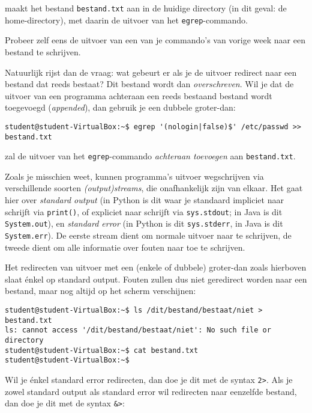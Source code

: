 \documentclass[a4paper,twoside,openany]{memoir}
\begin{document}
maakt het bestand \verb!bestand.txt! aan in de huidige directory (in dit geval:
de home-directory), met daarin de uitvoer van het \verb!egrep!-commando.

Probeer zelf eens de uitvoer van een van je commando's van vorige week naar een
bestand te schrijven.

Natuurlijk rijst dan de vraag: wat gebeurt er als je de uitvoer redirect naar
een bestand dat reeds bestaat? Dit bestand wordt dan \emph{overschreven}. Wil je
dat de uitvoer van een programma achteraan een reeds bestaand bestand wordt
toegevoegd (\emph{appended}), dan gebruik je een dubbele groter-dan:

\begin{verbatim}
student@student-VirtualBox:~$ egrep '(nologin|false)$' /etc/passwd >> bestand.txt
\end{verbatim}

zal de uitvoer van het \verb!egrep!-commando \emph{achteraan toevoegen} aan
\verb!bestand.txt!.

Zoals je misschien weet, kunnen programma's uitvoer wegschrijven via
verschillende soorten \emph{(output)streams}, die onafhankelijk zijn van elkaar.
Het gaat hier over \emph{standard output} (in Python is dit waar je standaard
impliciet naar schrijft via \verb!print()!, of expliciet naar schrijft via
\verb!sys.stdout!; in Java is dit \verb!System.out!), en \emph{standard error}
(in Python is dit \verb!sys.stderr!, in Java is dit \verb!System.err!). De
eerste stream dient om normale uitvoer naar te schrijven, de tweede dient om
alle informatie over fouten naar toe te schrijven.

Het redirecten van uitvoer met een (enkele of dubbele) groter-dan zoals
hierboven slaat énkel op standard output. Fouten zullen dus niet geredirect
worden naar een bestand, maar nog altijd op het scherm verschijnen:

\begin{verbatim}
student@student-VirtualBox:~$ ls /dit/bestand/bestaat/niet > bestand.txt
ls: cannot access '/dit/bestand/bestaat/niet': No such file or directory
student@student-VirtualBox:~$ cat bestand.txt
student@student-VirtualBox:~$
\end{verbatim}

Wil je énkel standard error redirecten, dan doe je dit met de syntax \verb!2>!.
Als je zowel standard output als standard error wil redirecten naar eenzelfde
bestand, dan doe je dit met de syntax \verb!&>!:
\end{document}
